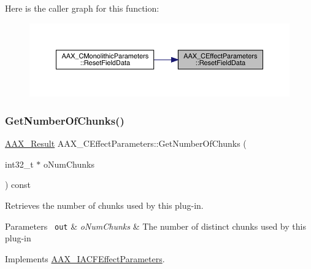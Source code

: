 Here is the caller graph for this function\+:
\nopagebreak
\begin{figure}[H]
\begin{center}
\leavevmode
\includegraphics[width=350pt]{a01481_a0dd675680a657de7f9d45d65d4b3bcfb_icgraph}
\end{center}
\end{figure}
\mbox{\label{a01481_a1b2e04986362ca076b862ceae18bbab7}} 
\subsubsection{\texorpdfstring{GetNumberOfChunks()}{GetNumberOfChunks()}}
{\footnotesize\ttfamily \mbox{\hyperlink{a00392_a4d8f69a697df7f70c3a8e9b8ee130d2f}{A\+A\+X\+\_\+\+Result}} A\+A\+X\+\_\+\+C\+Effect\+Parameters\+::\+Get\+Number\+Of\+Chunks (\begin{DoxyParamCaption}\item[{int32\+\_\+t $\ast$}]{o\+Num\+Chunks }\end{DoxyParamCaption}) const\hspace{0.3cm}{\ttfamily [virtual]}}



Retrieves the number of chunks used by this plug-\/in. 


\begin{DoxyParams}[1]{Parameters}
\mbox{\texttt{ out}}  & {\em o\+Num\+Chunks} & The number of distinct chunks used by this plug-\/in \\
\hline
\end{DoxyParams}


Implements \mbox{\hyperlink{a01669_a37e546c6dbb4d5a16fedb9f465de2599}{A\+A\+X\+\_\+\+I\+A\+C\+F\+Effect\+Parameters}}.

\mbox{\label{a01481_a493471529cb63af2e6b069f6c6a35d6f}} 

